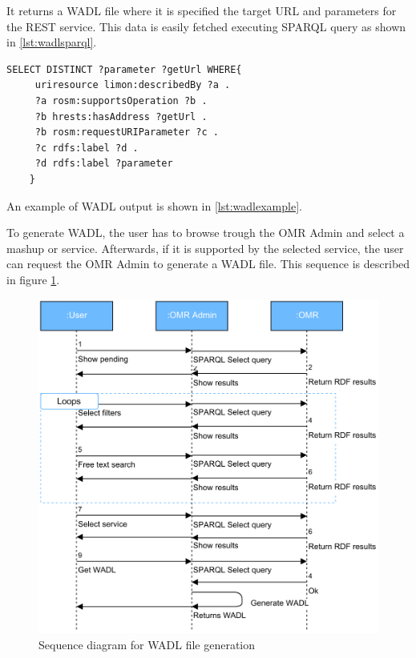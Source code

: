 It returns a WADL file where it is specified the target URL and parameters for the REST service.
This data is easily fetched executing SPARQL query as shown in \ref{lst:wadlsparql}.
\newpage
\begin{lstlisting}[breaklines=true, style=consola, caption={Retrieving information for WADL with SPARQL}, label={lst:wadlsparql}]
SELECT DISTINCT ?parameter ?getUrl WHERE{
	 uriresource limon:describedBy ?a .
	 ?a rosm:supportsOperation ?b .
	 ?b hrests:hasAddress ?getUrl .
	 ?b rosm:requestURIParameter ?c .
	 ?c rdfs:label ?d .
	 ?d rdfs:label ?parameter	 
	}
\end{lstlisting}

An example of WADL output is shown in \ref{lst:wadlexample}.




To generate WADL, the user has to browse trough the OMR Admin and select a mashup or service. Afterwards, if it is supported by the selected service, the user can request the OMR Admin to generate a WADL file. This sequence is described in figure \ref{fig:wadlsequence}.

\begin{figure}[h]
	\centering
	\includegraphics[width=350pt]{graphics/Diagrama_secuencia_wadl.pdf}
	\caption{Sequence diagram for WADL file generation}
	\label{fig:wadlsequence}
\end{figure}

